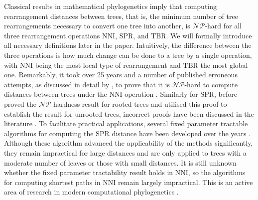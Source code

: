 \documentclass[11pt]{amsart}
\newcommand{\nni}{\mathrm{NNI}}
\newcommand{\spr}{\mathrm{SPR}}
\newcommand{\tbr}{\mathrm{TBR}}
\newcommand{\np}{\mathcal{NP}}
\newcommand{\summary}[1]{} %
\begin{document}
\summary{Motivation: However, all known graph-based tree rearrangement distances, including NNI, are NP-hard, and it took many years and paper to prove that; so approach such as practical FPT algorithms is an active area of research to overcome the computational (cite Whidden).}
Classical results in mathematical phylogenetics imply that computing rearrangement distances between trees, that is, the minimum number of tree rearrangements necessary to convert one tree into another, is $\np$-hard \autocite{Dasgupta2000-xa, Bordewich2005-nx, Hickey2008-wv, Allen2001-ky} for all three rearrangement operations $\nni$, $\spr$, and $\tbr$.
We will formally introduce all necessary definitions later in the paper.
Intuitively, the difference between the three operations is how much change can be done to a tree by a single operation, with $\nni$ being the most local type of rearrangement and $\tbr$ the most global one.
Remarkably, it took over 25 years and a number of published erroneous attempts, as discussed in detail by \textcite{Dasgupta2000-xa}, to prove that it is $\np$-hard to compute distances between trees under the $\nni$ operation \autocite{Dasgupta2000-xa}.
Similarly for $\spr$, before \textcite{Bordewich2005-nx} proved the $\np$-hardness result for rooted trees and \textcite{Hickey2008-wv} utilised this proof to establish the result for unrooted trees, incorrect proofs have been discussed in the literature \autocite{Hein1996-em, Allen2001-ky}.
To facilitate practical applications, several fixed parameter tractable algorithms for computing the $\spr$ distance have been developed over the years \autocite{Whidden2010-bw, Bordewich2005-nx, Whidden2018-fw}.
Although these algorithm advanced the applicability of the methods significantly, they remain impractical for large distances and are only applied to trees with a moderate number of leaves or those with small distances.
It is still unknown whether the fixed parameter tractability result holds in $\nni$, so the algorithms for computing shortest paths in $\nni$ remain largely impractical.
This is an active area of research in modern computational phylogenetics \autocite{Gavryushkin2018-ol}.
\end{document}
